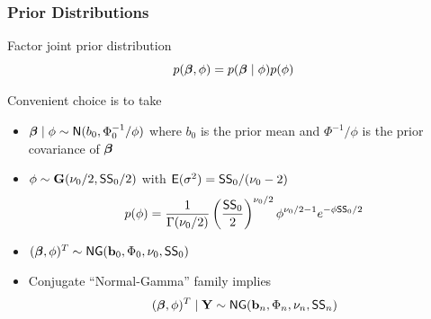 \documentclass[handout]{beamer}
\begin{document}
\begin{frame}
  \frametitle{Prior Distributions}
Factor joint prior distribution  $$p(\boldsymbol{\beta}, \phi) = p(\boldsymbol{\beta} \mid \phi) p(\phi)$$
\pause

Convenient choice is to take \pause
\begin{itemize}
\item $\boldsymbol{\beta} \mid \phi \sim \textsf{N}(b_0, \Phi_0^{-1}/\phi)$ where $b_0$ is the prior
  mean and $\Phi^{-1}/\phi$ is the prior covariance of $\boldsymbol{\beta}$ \pause
\item $\phi \sim \mathbf{G}( \nu_0/2, \textsf{SS}_0/2)$  with $\textsf{E}(\sigma^2) =
  \textsf{SS}_0/(\nu_0 - 2)$ \pause
$$p(\phi) = \frac{1}{\Gamma{(\nu_0/2)}} 
\left(\frac{\textsf{SS}_0}{2} \right)^{\nu_0/2} 
\phi^{\nu_0/2 - 1}
 e^{- \phi \textsf{SS}_0/2}
 $$\pause
\item $(\boldsymbol{\beta}, \phi)^T \sim \textsf{NG}(\mathbf{b}_0, \Phi_0, \nu_0, \textsf{SS}_0)$ \pause
\item Conjugate  ``Normal-Gamma'' family implies \pause
$$(\boldsymbol{\beta}, \phi)^T \mid \mathbf{Y} \sim \textsf{NG}(\mathbf{b}_n, \Phi_n, \nu_n, \textsf{SS}_n)$$
\end{itemize}
\end{frame}
\end{document}
